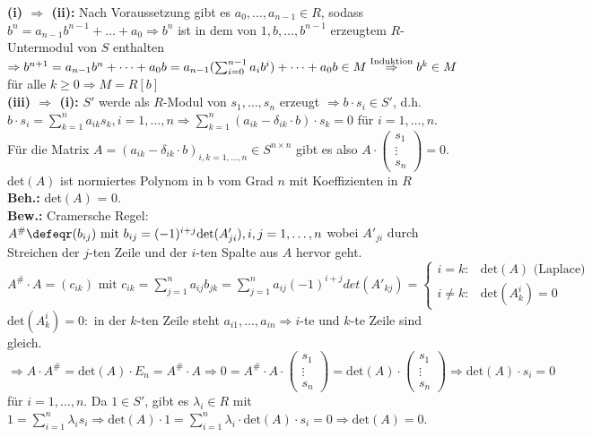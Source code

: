 \begin{Bew} 
  \textbf{(i) $\Rightarrow$ (ii):}
  Nach Voraussetzung gibt es $a_0, \dots , a_{n-1} \in R$, sodass $b^n = a_{n-1}
  b^{n-1} + \dots + a_0 \Rightarrow b^n$ ist in dem von $1, b, \dots , b^{n-1}$
  erzeugtem $R$-Untermodul von $S$ enthalten $\Rightarrow b^{n+1} = a_{n-1} b^n
  + \dots + a_0 b = a_{n-1} (\sum_{i=0}^{n-1} a_i b^i) + \dots + a_0 b \in M
  \overset{\mbox{\scriptsize Induktion}}{\Rightarrow} b^k \in M$ für alle $k \ge
  0 \Rightarrow M = R[b]$\\
  \textbf{(iii) $\Rightarrow$ (i):}
  $S'$ werde als $R$-Modul von $s_1, \dots , s_n$ erzeugt $\Rightarrow b \cdot
  s_i \in S'$, d.h. $b \cdot s_i = \sum_{k = 1}^n a_{i k} s_k, i=1,\dots,n
  \Rightarrow \sum_{k = 1}^n (a_{i k} -\delta_{i k} \cdot b) \cdot s_k = 0$ für
  $i=1, \dots, n$.\\
  Für die Matrix $A = (a_{i k} - \delta_{i k} \cdot b)_{i,k =1, \dots, n} \in S
  ^{n \times n}$ gibt es also $A \cdot \begin{pmatrix}s_1 \\ \vdots \\ s_n
  \end{pmatrix} = 0$.
  det$(A)$ ist normiertes Polynom in b vom Grad $n$ mit Koeffizienten in $R$\\
  \textbf{Beh.:} det$(A)$ = 0.\\
  \textbf{Bew.:} Cramersche Regel:\\
  $A^{\#} \defeqr (b_{i j}) \mbox{ mit } b_{i j} = (-1)^{i+j} \mbox{det}(A'_{j
  i}), i,j= 1, \dots, n$ wobei $A'_{j i}$ durch Streichen der $j$-ten Zeile und
  der $i$-ten Spalte aus $A$ hervor geht.\\
  $A^{\#} \cdot A = (c_{i k}) \mbox{ mit } c_{i k} = \sum_{j = 1}^n a_{i j} b_{j
  k} = \sum_{j = 1}^n a_{i j} (-1)^{i+j} det(A'_{k j}) = \begin{cases}
  i=k: & \mbox{det}(A) \mbox{ (Laplace)}\\
  i \not= k: & \mbox{det}(A_k^i) = 0
  \end{cases}$\\
  $\mbox{det}(A_k^i) = 0:$ in der $k$-ten Zeile steht $a_{i 1}, \dots , a_{i n}
  \Rightarrow i$-te und $k$-te Zeile sind gleich.\\
  $\Rightarrow A \cdot A^{\#} = \mbox{det}(A) \cdot E_n = A^{\#} \cdot A
  \Rightarrow 0 = A^{\#} \cdot A \cdot \begin{pmatrix}s_1 \\ \vdots \\ s_n 
  \end{pmatrix} = \mbox{det}(A) \cdot \begin{pmatrix}s_1 \\ \vdots \\ s_n 
  \end{pmatrix} \Rightarrow \mbox{det}(A) \cdot s_i = 0$ für $i = 1, \dots,
  n$.
  Da $1 \in S'$, gibt es $\lambda_i \in R$ mit $1 = \sum_{i=1}^n \lambda_i s_i
  \Rightarrow \mbox{det}(A) \cdot 1 = \sum_{i=1}^n \lambda_i \cdot \mbox{det}(A)
  \cdot s_i = 0 \Rightarrow \mbox{det}(A) = 0$.
\end{Bew}

